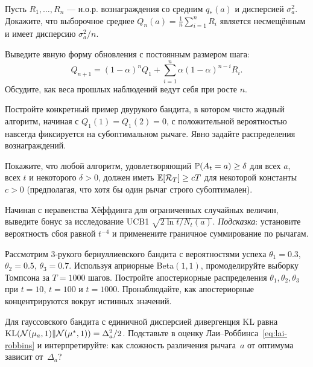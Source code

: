 \begin{exercise}
Пусть $R_1,\dots,R_n$ — н.о.р. вознаграждения со средним $q_*(a)$ и дисперсией $\sigma_a^2$.  Докажите, что выборочное среднее $Q_n(a)=\frac{1}{n}\sum_{i=1}^{n}R_i$ является несмещённым и имеет дисперсию $\sigma_a^2/n$.
\end{exercise}

\begin{exercise}
Выведите явную форму обновления с постоянным размером шага:
\[
Q_{n+1} = (1-\alpha)^n Q_1 + \sum_{i=1}^{n}\alpha(1-\alpha)^{n-i}R_i.
\]
Обсудите, как веса прошлых наблюдений ведут себя при росте $n$.
\end{exercise}

\begin{exercise}
Постройте конкретный пример двурукого бандита, в котором чисто жадный алгоритм, начиная с $Q_1(1)=Q_1(2)=0$, с положительной вероятностью навсегда фиксируется на субоптимальном рычаге.  Явно задайте распределения вознаграждений.
\end{exercise}

\begin{exercise}
Покажите, что любой алгоритм, удовлетворяющий $\mathbb{P}(A_t=a)\ge\delta$ для всех $a$, всех $t$ и некоторого $\delta>0$, должен иметь $\operatorname{\mathbb{E}}[\mathcal{R}_T]\ge cT$ для некоторой константы $c>0$ (предполагая, что хотя бы один рычаг строго субоптимален).
\end{exercise}

\begin{exercise}
\label{ex:ucb-bonus}
Начиная с неравенства Хёффдинга для ограниченных случайных величин, выведите бонус за исследование UCB1 $\sqrt{2\ln t/N_t(a)}$.  \emph{Подсказка}: установите вероятность сбоя равной $t^{-4}$ и применените граничное суммирование по рычагам.
\end{exercise}

\begin{exercise}
\label{ex:thompson-sim}
Рассмотрим $3$-рукого бернуллиевского бандита с вероятностями успеха $\theta_1=0.3$, $\theta_2=0.5$, $\theta_3=0.7$.  Используя априорные Beta$(1,1)$, промоделируйте выборку Томпсона за $T=1000$ шагов.  Постройте апостериорные распределения $\theta_1,\theta_2,\theta_3$ при $t=10$, $t=100$ и $t=1000$.  Пронаблюдайте, как апостериорные концентрируются вокруг истинных значений.
\end{exercise}

\begin{exercise}
\label{ex:lai-robbins-gaussian}
Для гауссовского бандита с единичной дисперсией дивергенция KL равна $\mathrm{KL}(\mathcal{N}(\mu_a,1)\|\mathcal{N}(\mu^*,1))=\Delta_a^2/2$.  Подставьте в оценку Лаи--Роббинса~\eqref{eq:lai-robbins} и интерпретируйте: как сложность различения рычага~$a$ от оптимума зависит от~$\Delta_a$?
\end{exercise}

